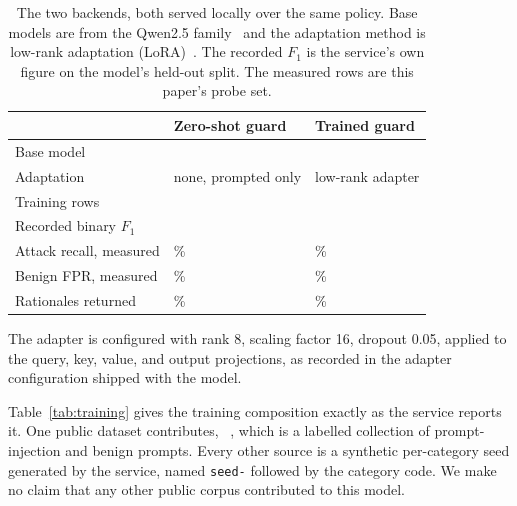 \documentclass[conference]{IEEEtran}
\begin{document}
\begin{table}[t]
\centering
\footnotesize
\begin{tabular}{lll}
\toprule
 & Zero-shot guard & Trained guard \\
\midrule
Base model & \texttt{\BaseZs{}} & \texttt{\BaseTr{}} \\
Adaptation & none, prompted only & low-rank adapter \\
Training rows & \NTrainTotalZs{} & \NTrainTotalTr{} \\
Recorded binary $F_1$ & \ReportedFOneZs{} & \ReportedFOneTr{} \\
Attack recall, measured & \BinTprZs{}\% & \BinTprTr{}\% \\
Benign FPR, measured & \BinFprZs{}\% & \BinFprTr{}\% \\
Rationales returned & \ExplainCoverageZs{}\% & \ExplainCoverageTr{}\% \\
\bottomrule
\end{tabular}
\caption{The two backends, both served locally over the same policy.
Base models are from the Qwen2.5 family~\cite{qwen2024report} and the
adaptation method is low-rank adaptation (LoRA)~\cite{hu2022lora}. The
recorded $F_1$ is the service's own figure on the model's held-out split. The
measured rows are this paper's probe set.}
\label{tab:backends}
\end{table}

The adapter is configured with rank 8, scaling factor 16, dropout 0.05, applied
to the query, key, value, and output projections, as recorded in the adapter
configuration shipped with the model.

Table~\ref{tab:training} gives the training composition exactly as the service
reports it. One public dataset contributes,
\ExternalSourceListTr{}~\cite{deepset_promptinjections}, which is a labelled
collection of prompt-injection and benign prompts. Every other source is a
synthetic per-category seed generated by the service, named \texttt{seed-}
followed by the category code. We make no claim that any other public corpus
contributed to this model.

\begin{table}[h]
\centering
\footnotesize

\caption{Trained guard: rows per training source, from the service's model
record. Sources named \texttt{seed-} are synthetic.}
\label{tab:training}
\end{table}

\begin{table}[h]
\centering
\footnotesize

\caption{Trained guard: training rows per policy category. The jailbreak
category S6 is supervised with \NTrainSsixTr{} rows.}
\label{tab:traincat}
\end{table}
\end{document}
